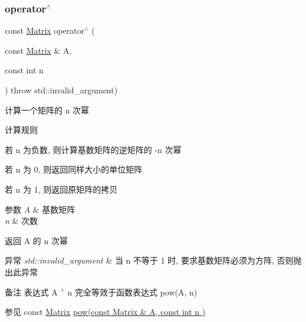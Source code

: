 \subsubsection{\texorpdfstring{operator$^\wedge$}{operator^}}
{\footnotesize\ttfamily const \hyperlink{classkerbal_1_1math_1_1_matrix}{Matrix} operator$^\wedge$ (\begin{DoxyParamCaption}\item[{const \hyperlink{classkerbal_1_1math_1_1_matrix}{Matrix} \&}]{A,  }\item[{const int}]{n }\end{DoxyParamCaption}) throw  std\+::invalid\+\_\+argument) \hspace{0.3cm}{\ttfamily [friend]}}



计算一个矩阵的 n 次幂 

\begin{DoxyParagraph}{计算规则}

\begin{DoxyItemize}
\item 若 n 为负数, 则计算基数矩阵的逆矩阵的 -\/n 次幂~\newline

\item 若 n 为 0, 则返回同样大小的单位矩阵~\newline

\item 若 n 为 1, 则返回原矩阵的拷贝 
\end{DoxyItemize}
\end{DoxyParagraph}

\begin{DoxyParams}{参数}
{\em A} & 基数矩阵 \\
\hline
{\em n} & 次数 \\
\hline
\end{DoxyParams}
\begin{DoxyReturn}{返回}
A 的 n 次幂 
\end{DoxyReturn}

\begin{DoxyExceptions}{异常}
{\em std\+::invalid\+\_\+argument} & 当 n 不等于 1 时, 要求基数矩阵必须为方阵, 否则抛出此异常 \\
\hline
\end{DoxyExceptions}
\begin{DoxyRemark}{备注}
表达式 A $^\wedge$ n 完全等效于函数表达式 pow(\+A, n) 
\end{DoxyRemark}
\begin{DoxySeeAlso}{参见}
const \hyperlink{classkerbal_1_1math_1_1_matrix}{Matrix} \hyperlink{classkerbal_1_1math_1_1_matrix_a35bd334cc41142e574a3261853fd14d2}{pow(const Matrix \& A, const int n )} 
\end{DoxySeeAlso}
\mbox{\label{classkerbal_1_1math_1_1_matrix_aaa58ea23f11a2f1ad42b487f9a6d0245}} 
